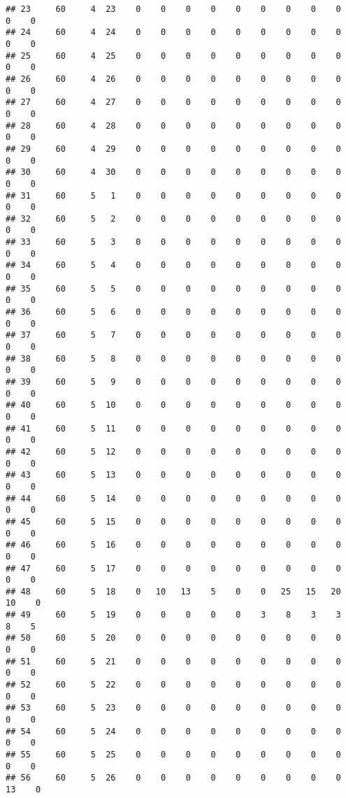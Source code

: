 \documentclass[]{article}
\begin{document}
\begin{verbatim}
## 23     60     4  23    0    0    0    0    0    0    0    0    0    0    0
## 24     60     4  24    0    0    0    0    0    0    0    0    0    0    0
## 25     60     4  25    0    0    0    0    0    0    0    0    0    0    0
## 26     60     4  26    0    0    0    0    0    0    0    0    0    0    0
## 27     60     4  27    0    0    0    0    0    0    0    0    0    0    0
## 28     60     4  28    0    0    0    0    0    0    0    0    0    0    0
## 29     60     4  29    0    0    0    0    0    0    0    0    0    0    0
## 30     60     4  30    0    0    0    0    0    0    0    0    0    0    0
## 31     60     5   1    0    0    0    0    0    0    0    0    0    0    0
## 32     60     5   2    0    0    0    0    0    0    0    0    0    0    0
## 33     60     5   3    0    0    0    0    0    0    0    0    0    0    0
## 34     60     5   4    0    0    0    0    0    0    0    0    0    0    0
## 35     60     5   5    0    0    0    0    0    0    0    0    0    0    0
## 36     60     5   6    0    0    0    0    0    0    0    0    0    0    0
## 37     60     5   7    0    0    0    0    0    0    0    0    0    0    0
## 38     60     5   8    0    0    0    0    0    0    0    0    0    0    0
## 39     60     5   9    0    0    0    0    0    0    0    0    0    0    0
## 40     60     5  10    0    0    0    0    0    0    0    0    0    0    0
## 41     60     5  11    0    0    0    0    0    0    0    0    0    0    0
## 42     60     5  12    0    0    0    0    0    0    0    0    0    0    0
## 43     60     5  13    0    0    0    0    0    0    0    0    0    0    0
## 44     60     5  14    0    0    0    0    0    0    0    0    0    0    0
## 45     60     5  15    0    0    0    0    0    0    0    0    0    0    0
## 46     60     5  16    0    0    0    0    0    0    0    0    0    0    0
## 47     60     5  17    0    0    0    0    0    0    0    0    0    0    0
## 48     60     5  18    0   10   13    5    0    0   25   15   20   10    0
## 49     60     5  19    0    0    0    0    0    3    8    3    3    8    5
## 50     60     5  20    0    0    0    0    0    0    0    0    0    0    0
## 51     60     5  21    0    0    0    0    0    0    0    0    0    0    0
## 52     60     5  22    0    0    0    0    0    0    0    0    0    0    0
## 53     60     5  23    0    0    0    0    0    0    0    0    0    0    0
## 54     60     5  24    0    0    0    0    0    0    0    0    0    0    0
## 55     60     5  25    0    0    0    0    0    0    0    0    0    0    0
## 56     60     5  26    0    0    0    0    0    0    0    0    0   13    0

\end{verbatim}
\end{document}
